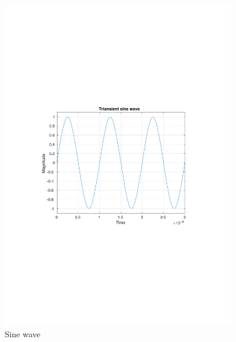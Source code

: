 \documentclass[12pt,a4paper,UKenglish]{article}
\begin{document}
\begin{figure} [H]
  \centering 
  \includegraphics[width=0.9\textwidth]{img/2a_tran.pdf} 
  \caption{Sine wave}
  \label{tran_sin} 
\end{figure}
\end{document}
